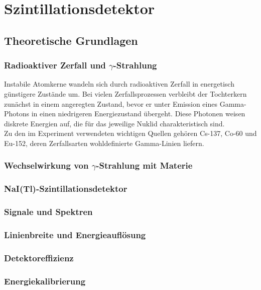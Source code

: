 \chapter{Szintillationsdetektor}
\section{Theoretische Grundlagen}
\subsection{Radioaktiver Zerfall und $\gamma$-Strahlung}
Instabile Atomkerne wandeln sich durch radioaktiven Zerfall in energetisch günstigere Zustände um. Bei vielen Zerfallsprozessen verbleibt der Tochterkern zunächst in einem angeregten Zustand, bevor er unter Emission eines Gamma-Photons in einen niedrigeren Energiezustand übergeht. Diese Photonen weisen diskrete Energien auf, die für das jeweilige Nuklid charakteristisch sind.\\

Zu den im Experiment verwendeten wichtigen Quellen gehören Cs-137, Co-60 und Eu-152, deren Zerfallsarten wohldefinierte Gamma-Linien liefern.
\subsection{Wechselwirkung von $\gamma$-Strahlung mit Materie}

\subsection{NaI(Tl)-Szintillationsdetektor}
\subsection{Signale und Spektren}
\subsection{Linienbreite und Energieauflösung}
\subsection{Detektoreffizienz}
\subsection{Energiekalibrierung}

